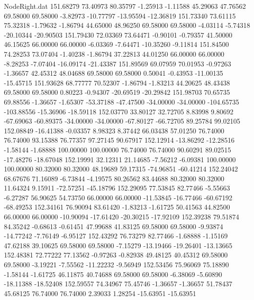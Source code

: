 \begin{filecontents}{NodeRight.dat}
 151.68279   73.40973   80.35797    -1.25913   -1.11588   45.29063   47.76562   69.58000   69.58000   -3.82973  -10.77797  -13.95594  -12.36819
 151.73340   73.61115   75.32318    -1.79632   -1.86794   44.65000   48.96250   69.58000   69.58000   -4.03114   -5.74318  -20.10344  -20.90503
 151.79430   72.03369   73.64471    -0.90101   -0.79357   41.50000   46.15625   66.00000   66.00000   -6.03369   -7.64471  -10.35260   -9.11814
 151.84500   74.28253   73.07404    -1.40238   -1.86794   37.22813   44.01250   66.00000   66.00000   -8.28253   -7.07404  -16.09174  -21.43387
 151.89569   69.07959   70.01953    -0.97263   -1.36657   42.45312   48.04688   69.58000   69.58000    0.50041   -0.43953  -11.00135  -15.45715
 151.93628   68.77777   70.52307    -1.86794   -1.83213   44.20625   48.43438   69.58000   69.58000    0.80223   -0.94307  -20.69519  -20.29842
 151.98703   70.65735   69.88556    -1.36657   -1.65307  -53.37188  -47.47500  -34.00000  -34.00000 -104.65735 -103.88556  -15.36906  -18.59118
 152.03770   33.80127   32.72705     8.83998    9.80692  -67.69063  -60.89375  -34.00000  -34.00000  -67.80127  -66.72705   89.25784   99.02105
 152.08849  -16.41388   -0.03357     8.98323    8.37442   66.03438   57.01250   76.74000   76.74000   93.15388   76.77357   97.27145   90.67917
 152.12914  -13.86292  -12.28516    -1.58144   -1.68888  100.00000  100.00000   76.74000   76.74000   90.60291   89.02515  -17.48276  -18.67048
 152.19991   32.12311   21.14685    -7.56212   -6.09381  100.00000  100.00000   80.32000   80.32000   48.19689   59.17315  -74.96851  -60.41214
 152.24042   68.67676   71.16089    -6.73844   -4.19575   80.26562   83.44688   80.32000   80.32000   11.64324    9.15911  -72.57251  -45.18796
 152.29095   77.53845   82.77466    -5.55663   -6.27287   56.90625   54.73750   66.00000   66.00000  -11.53845  -16.77466  -60.67192  -68.49253
 152.34161   76.90094   83.61420    -1.83213   -1.61725   50.41563   44.82500   66.00000   66.00000  -10.90094  -17.61420  -20.30215  -17.92109
 152.39238   79.51874   84.35242    -0.68613   -0.61451   47.99688   41.83125   69.58000   69.58000   -9.93874  -14.77242   -7.76149   -6.95127
 152.43292   76.73279   82.77466    -1.68888   -1.15169   47.62188   39.10625   69.58000   69.58000   -7.15279  -13.19466  -19.26401  -13.13665
 152.48381   72.77222   77.13562    -0.97263   -0.82938   49.48125   40.45312   69.58000   69.58000   -3.19221   -7.55562  -11.22232   -9.56949
 152.53456   75.96069   75.18890    -1.58144   -1.61725   46.11875   40.74688   69.58000   69.58000   -6.38069   -5.60890  -18.11388  -18.52408
 152.59557   74.34967   75.45746    -1.36657   -1.36657   51.78437   45.68125   76.74000   76.74000    2.39033    1.28254  -15.63951  -15.63951

\end{filecontents}
